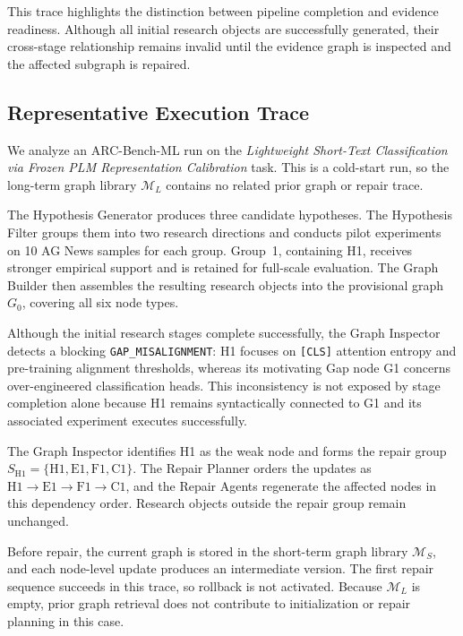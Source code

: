 \documentclass[letterpaper]{article} %
\begin{document}
This trace highlights the distinction between pipeline completion and evidence readiness. Although all initial research objects are successfully generated, their cross-stage relationship remains invalid until the evidence graph is inspected and the affected subgraph is repaired.
\subsection{Representative Execution Trace}
\label{sec:case-study}

We analyze an ARC-Bench-ML run on the \emph{Lightweight Short-Text Classification via Frozen PLM Representation Calibration} task. This is a cold-start run, so the long-term graph library $\mathcal{M}_L$ contains no related prior graph or repair trace.

The Hypothesis Generator produces three candidate hypotheses. The Hypothesis Filter groups them into two research directions and conducts pilot experiments on 10 AG News samples for each group. Group~1, containing H1, receives stronger empirical support and is retained for full-scale evaluation. The Graph Builder then assembles the resulting research objects into the provisional graph $G_0$, covering all six node types.

Although the initial research stages complete successfully, the Graph Inspector detects a blocking \texttt{GAP\_MISALIGNMENT}: H1 focuses on \texttt{[CLS]} attention entropy and pre-training alignment thresholds, whereas its motivating Gap node G1 concerns over-engineered classification heads. This inconsistency is not exposed by stage completion alone because H1 remains syntactically connected to G1 and its associated experiment executes successfully.

The Graph Inspector identifies H1 as the weak node and forms the repair group $S_{\mathrm{H1}}=\{\mathrm{H1},\mathrm{E1},\mathrm{F1},\mathrm{C1}\}$. The Repair Planner orders the updates as $\mathrm{H1}\rightarrow\mathrm{E1}\rightarrow\mathrm{F1}\rightarrow \mathrm{C1}$, and the Repair Agents regenerate the affected nodes in this dependency order. Research objects outside the repair group remain unchanged.

Before repair, the current graph is stored in the short-term graph library $\mathcal{M}_S$, and each node-level update produces an intermediate version. The first repair sequence succeeds in this trace, so rollback is not activated. Because $\mathcal{M}_L$ is empty, prior graph retrieval does not contribute to initialization or repair planning in this case.
\end{document}
